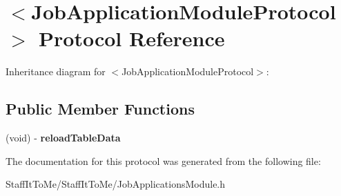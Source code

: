 \hypertarget{protocol_job_application_module_protocol-p}{
\section{$<$\-Job\-Application\-Module\-Protocol$>$ \-Protocol \-Reference}
\label{protocol_job_application_module_protocol-p}
}


\-Inheritance diagram for $<$\-Job\-Application\-Module\-Protocol$>$\-:
\subsection*{\-Public \-Member \-Functions}
\begin{DoxyCompactItemize}
\item 
\hypertarget{protocol_job_application_module_protocol-p_a5eca6000de668fbf7bf178d856340fb7}{
(void) -\/ {\bfseries reload\-Table\-Data}}
\label{protocol_job_application_module_protocol-p_a5eca6000de668fbf7bf178d856340fb7}

\end{DoxyCompactItemize}


\-The documentation for this protocol was generated from the following file\-:\begin{DoxyCompactItemize}
\item 
\-Staff\-It\-To\-Me/\-Staff\-It\-To\-Me/\-Job\-Applications\-Module.\-h\end{DoxyCompactItemize}
